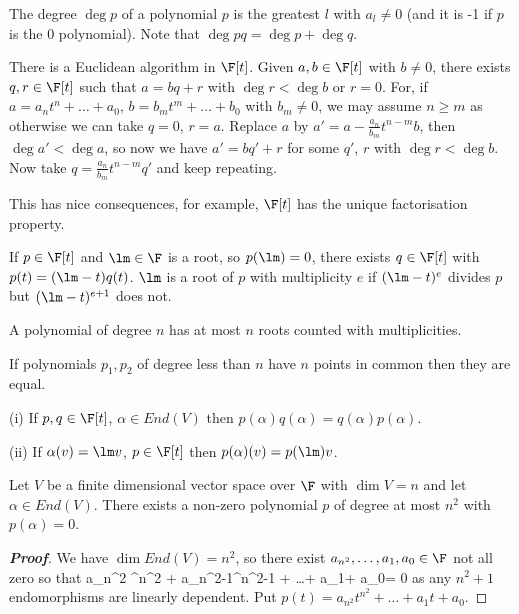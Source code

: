 The degree $\deg p$ of a polynomial $p$ is the greatest $l$ with $a_l \neq 0$ (and it is -1 if $p$ is the 0 polynomial). Note that $\deg pq = \deg p + \deg q$.

There is a Euclidean algorithm in $\F[t]$. Given $a, b \in \F[t]$ with $b \neq 0$, there exists $q, r \in \F[t]$ such that $a = bq + r$ with $\deg r < \deg b$ or $r = 0$. For, if $a = a_nt^n + \dots + a_0$, $b = b_mt^m +\dots +b_0$ with $b_m \neq 0$, we may assume $n \geq m$ as otherwise we can take $q = 0$,
$r = a$. Replace $a$ by $a' = a- \frac{a_n}{b_m} t^{n-m} b$, then $\deg a' < \deg a$, so now we have $a' = bq' +r$ for some $q'$, $r$ with $\deg r < \deg b$. Now take $q = \frac{a_n}{b_m} t^{n-m} q'$ and keep repeating.

This has nice consequences, for example, $\F[t]$ has the unique factorisation property.

If $p \in \F[t]$ and $\lm \in \F$ is a root, so $p(\lm) = 0$, there exists $q \in \F[t]$ with $p(t) = (\lm - t)q(t)$. $\lm$ is a root of $p$ with multiplicity $e$ if $(\lm - t)^e$ divides $p$ but $(\lm - t)^{e+1}$ does not.

A polynomial of degree $n$ has at most $n$ roots counted with multiplicities.

If polynomials $p_1, p_2$ of degree less than $n$ have $n$ points in common then they are equal.

\begin{lemma}
\ben
\item [(i)] If $p, q \in \F[t]$, $\alpha \in End(V )$ then $p(\alpha)q(\alpha) = q(\alpha)p(\alpha)$.
\item [(ii)] If $\alpha(v) = \lm v$, $p \in \F[t]$ then $p(\alpha)(v) = p(\lm)v$.
\een
\end{lemma}


\begin{lemma}
Let $V$ be a finite dimensional vector space over $\F$ with $\dim V = n$ and let $\alpha \in End(V )$. There exists a non-zero polynomial $p$ of degree at most $n^2$ with $p(\alpha) = 0$.
\end{lemma}

\begin{proof}[\bf Proof]
We have $\dim End(V ) = n^2$, so there exist $a_{n^2}, \dots, a_1, a_0 \in \F$ not all zero so that
\be
a_{n^2} \alpha^{n^2} + a_{n^2-1}\alpha^{n^2-1} + \dots + a_1\alpha + a_0\iota = 0
\ee
as any $n^2+1$ endomorphisms are linearly dependent. Put $p(t) = a_{n^2} t^{n^2} +\dots +a_1t+a_0$.
\end{proof}

